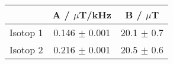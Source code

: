 \begin{table}\centering\begin{tabular}{ccc} \toprule 
\centering
 & A / $\mu$T/kHz  & B / $\mu$T \\ \midrule
Isotop 1 & 0.146 $\pm$ 0.001 & 20.1 $\pm$ 0.7 \\
Isotop 2 & 0.216 $\pm$ 0.001 & 20.5 $\pm$ 0.6 \\
\bottomrule
\end{tabular}
\end{table}
